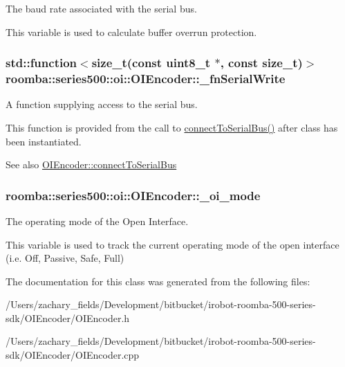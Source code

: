 The baud rate associated with the serial bus. 

This variable is used to calculate buffer overrun protection. \hypertarget{classroomba_1_1series500_1_1oi_1_1_o_i_encoder_adea2ff25939589efd18d0ae64b14049b}{
\subsubsection[{\+\_\+fn\+Serial\+Write}]{\setlength{\rightskip}{0pt plus 5cm}std\+::function$<$size\+\_\+t(const uint8\+\_\+t $\ast$, const size\+\_\+t)$>$ roomba\+::series500\+::oi\+::\+O\+I\+Encoder\+::\+\_\+fn\+Serial\+Write\hspace{0.3cm}{\ttfamily [protected]}}}\label{classroomba_1_1series500_1_1oi_1_1_o_i_encoder_adea2ff25939589efd18d0ae64b14049b}


A function supplying access to the serial bus. 

This function is provided from the call to \hyperlink{classroomba_1_1series500_1_1oi_1_1_o_i_encoder_a94c90ba60036d4647c1286107520f60a}{connect\+To\+Serial\+Bus()} after class has been instantiated. \begin{DoxySeeAlso}{See also}
\hyperlink{classroomba_1_1series500_1_1oi_1_1_o_i_encoder_a94c90ba60036d4647c1286107520f60a}{O\+I\+Encoder\+::connect\+To\+Serial\+Bus} 
\end{DoxySeeAlso}
\hypertarget{classroomba_1_1series500_1_1oi_1_1_o_i_encoder_a22983349615457194a9714375f391b8b}{
\subsubsection[{\+\_\+oi\+\_\+mode}]{ roomba\+::series500\+::oi\+::\+O\+I\+Encoder\+::\+\_\+oi\+\_\+mode\hspace{0.3cm}{\ttfamily [protected]}}}\label{classroomba_1_1series500_1_1oi_1_1_o_i_encoder_a22983349615457194a9714375f391b8b}


The operating mode of the Open Interface. 

This variable is used to track the current operating mode of the open interface (i.\+e. Off, Passive, Safe, Full) 

The documentation for this class was generated from the following files\+:\begin{DoxyCompactItemize}
\item 
/\+Users/zachary\+\_\+fields/\+Development/bitbucket/irobot-\/roomba-\/500-\/series-\/sdk/\+O\+I\+Encoder/O\+I\+Encoder.\+h\item 
/\+Users/zachary\+\_\+fields/\+Development/bitbucket/irobot-\/roomba-\/500-\/series-\/sdk/\+O\+I\+Encoder/O\+I\+Encoder.\+cpp\end{DoxyCompactItemize}
